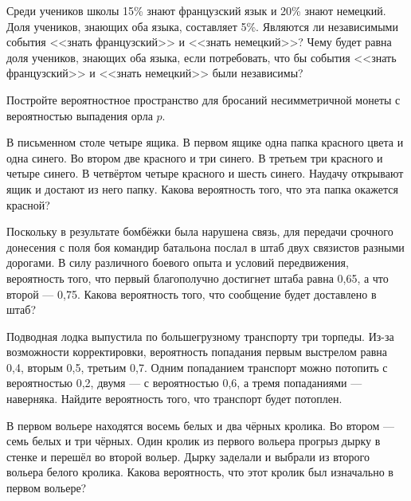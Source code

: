 \documentclass[a4paper,12pt]{article}
\begin{document}
\def\exec{\makebox[25pt]{\put(-5,3){\line(0,1){3}}\put(-5,3){\vector(1,0){11}}}}
\def\вып{\makebox[22pt]{\put(-5,3){\line(0,1){3}}\put(-5,3){\vector(1,0){11}}}}

  Среди учеников школы 15\% знают французский язык и 20\% знают немецкий. Доля учеников, знающих оба языка, составляет 5\%.
   Являются ли независимыми события <<знать французский>> и <<знать немецкий>>?
   Чему будет равна доля учеников, знающих оба языка, если потребовать, что бы события <<знать французский>> и <<знать немецкий>> были независимы?


  Постройте вероятностное пространство для бросаний несимметричной монеты с вероятностью выпадения орла $p$.

  В письменном столе четыре ящика. В первом ящике одна папка красного цвета и одна синего. Во втором две красного и три синего. В третьем три красного и четыре синего. В четвёртом четыре красного и шесть синего. Наудачу открывают ящик и достают из него папку. Какова вероятность того, что эта папка окажется красной?

  Поскольку в результате бомбёжки была нарушена связь, для передачи срочного донесения с поля боя командир батальона послал в штаб двух связистов разными дорогами. В силу различного боевого опыта и условий передвижения, вероятность того, что первый благополучно достигнет штаба равна 0,65, а что второй --- 0,75. Какова вероятность того, что сообщение будет доставлено в штаб?

  Подводная лодка выпустила по большегрузному транспорту три торпеды. Из-за возможности корректировки, вероятность попадания первым выстрелом равна 0,4, вторым 0,5, третьим 0,7. Одним попаданием транспорт можно потопить с вероятностью 0,2, двумя --- с вероятностью 0,6, а тремя попаданиями --- наверняка. Найдите вероятность того, что транспорт будет потоплен.

  В первом вольере находятся восемь белых и два чёрных кролика. Во втором --- семь белых и три чёрных. Один кролик из первого вольера прогрыз дырку в стенке и перешёл во второй вольер. Дырку заделали и выбрали из второго вольера белого кролика. Какова вероятность, что этот кролик был изначально в первом вольере?
\end{document}
